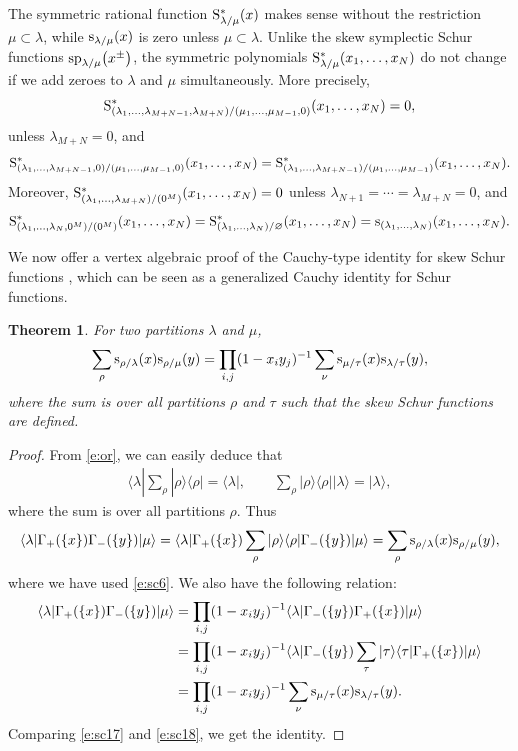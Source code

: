 \documentclass[pdftex]{sigma}
\numberwithin{equation}{section}
\newtheorem{Theorem}{Theorem}[section]
\begin{document}
\begin{Remark}
The symmetric rational function ${\rm S}^*_{\lambda/\mu}(x)$ makes sense without the restriction $\mu\subset\lambda$, while ${\rm s}_{\lambda/\mu}(x)$ is zero unless $\mu\subset\lambda$. Unlike the skew symplectic Schur functions ${\rm sp}_{\lambda/\mu}\big(x^{\pm}\big)$, the symmetric
polynomials ${\rm S}^*_{\lambda/\mu}(x_1,\dots,x_N)$
do not change if we add zeroes to $\lambda$ and $\mu$ simultaneously.
More precisely,
\[
{\rm S}^*_{(\lambda_1,\dots,\lambda_{M+N-1},\lambda_{M+N})/(\mu_1,\dots,\mu_{M-1},0)}(x_1,\dots,x_N)=0,
\]
 unless $\lambda_{M+N}=0$, and
\[
{\rm S}^*_{(\lambda_1,\dots,\lambda_{M+N-1},0)/(\mu_1,\dots,\mu_{M-1},0)}(x_1,\dots,x_N)={\rm S}^*_{(\lambda_1,\dots,\lambda_{M+N-1})/(\mu_1,\dots,\mu_{M-1})}(x_1,\dots,x_N).
\]
Moreover,
${\rm S}^*_{(\lambda_1,\dots,\lambda_{M+N})/(0^M)}(x_1,\dots,x_N)=0$ unless $\lambda_{N+1}=\cdots=\lambda_{M+N}=0$,
 and
 \[
 {\rm S}^*_{(\lambda_1,\dots,\lambda_{N},0^M)/(0^M)}(x_1,\dots,x_N)={\rm S}^*_{(\lambda_1,\dots,\lambda_{N})/\varnothing}(x_1,\dots,x_N)
 ={\rm s}_{(\lambda_1,\dots,\lambda_{N})}(x_1,\dots,x_N).
 \]
\end{Remark}
We now offer a vertex algebraic proof of the Cauchy-type identity for skew Schur functions \mbox{\cite[p.~93]{Mac1995}}, which can be seen as a generalized Cauchy identity for Schur functions.
\begin{Theorem}For two partitions $\lambda$ and $\mu$,
\[
\sum_\rho {\rm s}_{\rho/\lambda}(x){\rm s}_{\rho/\mu}(y)=\prod_{i,j}(1-x_iy_j)^{-1}\sum_\nu {\rm s}_{\mu/\tau}(x){\rm s}_{\lambda/\tau}(y),
\]
where the sum is over all partitions $\rho$ and $\tau$ such that the skew Schur functions are defined.
\end{Theorem}
\begin{proof}
From \eqref{e:or}, we can easily deduce that
\begin{align*}%
\langle\lambda|\sum_{\rho}|\rho\rangle\langle\rho|=\langle\lambda|,\qquad \sum_{\rho}|\rho\rangle\langle\rho||\lambda\rangle=|\lambda\rangle,
\end{align*}
where the sum is over all partitions $\rho$.
Thus
\begin{align}\label{e:sc17}
\langle \lambda|\Gamma_+(\{x\})\Gamma_-(\{y\})|\mu\rangle
=\langle \lambda|\Gamma_+(\{x\})\sum_{\rho}|\rho\rangle\langle\rho|\Gamma_-(\{y\})|\mu\rangle
=\sum_\rho {\rm s}_{\rho/\lambda}(x){\rm s}_{\rho/\mu}(y),
\end{align}
where we have used \eqref{e:sc6}. We also have the following relation:
\begin{align}
\notag\langle \lambda|\Gamma_+(\{x\})\Gamma_-(\{y\})|\mu\rangle &{}= \prod_{i,j}(1-x_iy_j)^{-1}\langle \lambda|\Gamma_-(\{y\})\Gamma_+(\{x\})|\mu\rangle\\
\notag &{}=\prod_{i,j}(1-x_iy_j)^{-1}\langle \lambda|\Gamma_-(\{y\})\sum_{\tau}|\tau\rangle\langle\tau|\Gamma_+(\{x\})|\mu\rangle\\
 &{}= \prod_{i,j}(1-x_iy_j)^{-1}\sum_\nu {\rm s}_{\mu/\tau}(x){\rm s}_{\lambda/\tau}(y).\label{e:sc18}
\end{align}
Comparing \eqref{e:sc17} and \eqref{e:sc18}, we get the identity.
\end{proof}
\end{document}
